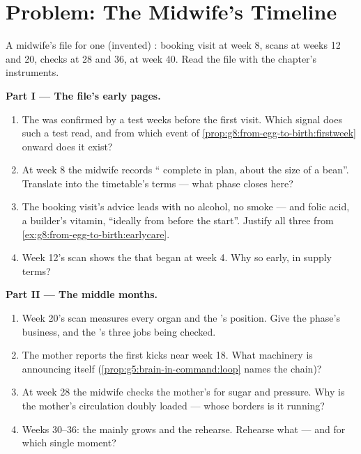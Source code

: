 \section{Problem: The Midwife's Timeline}

\begin{problem}\label{pb:g8:from-egg-to-birth:1}
A midwife's file for one (invented) : booking
visit at week 8, scans at weeks 12 and 20, checks at 28
and 36,  at week 40. Read the file with the
chapter's instruments.

\medskip\noindent\textbf{Part I --- The file's early
pages.}
\begin{enumerate}
  \item The  was confirmed by a  test
        weeks before the first visit. Which signal does
        such a test read, and from which event of
        \cref{prop:g8:from-egg-to-birth:firstweek}
        onward does it exist?
  \item At week 8 the midwife records `` complete
        in plan, about the size of a bean''. Translate
        into the timetable's terms --- what phase closes
        here?
  \item The booking visit's advice leads with no
        alcohol, no smoke --- and folic acid, a builder's
        vitamin, ``ideally from before the start''.
        Justify all three from
        \cref{ex:g8:from-egg-to-birth:earlycare}.
  \item Week 12's scan shows the  that began at
        week 4. Why so early, in supply terms?
\end{enumerate}

\medskip\noindent\textbf{Part II --- The middle months.}
\begin{enumerate}[resume]
  \item Week 20's scan measures every organ and the
        's position. Give the  phase's
        business, and the 's three jobs being
        checked.
  \item The mother reports the first kicks near week
        18. What machinery is announcing itself
        (\cref{prop:g5:brain-in-command:loop} names the
        chain)?
  \item At week 28 the midwife checks the mother's
         for sugar and pressure. Why is the
        mother's circulation doubly loaded --- whose
        borders is it running?
  \item Weeks 30--36: the  mainly grows and the
         rehearse. Rehearse what --- and for which
        single moment?
\end{enumerate}


\end{problem}
